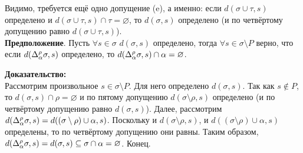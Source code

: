 \hrulefill

Видимо, требуется ещё одно допущение (e), а именно: если $d(\sigma \cup \tau, s)$ определено и $d(\sigma \cup \tau, s) \cap \tau = \varnothing$, то $d(\sigma, s)$ определено (и по четвёртому допущению равно $d(\sigma \cup \tau, s)$).\\

\textbf{Предположение}. Пусть $\forall s \in \sigma$ $d(\sigma, s)$ определено, тогда $\forall s \in \sigma \setminus P$ верно, что если $d(\Delta_\alpha^\rho\sigma, s)$ определено, то $d(\Delta_\alpha^\rho\sigma, s) \cap \alpha = \varnothing$.

\textbf{Доказательство:}\\
Рассмотрим произвольное $s \in \sigma \setminus P$. Для него определено $d(\sigma, s)$. Так как $s \notin P$, то $d(\sigma, s) \cap \rho = \varnothing$ и по пятому допущению $d(\sigma \setminus \rho, s)$ определено (и по четвёртому допущению равно $d(\sigma, s)$). Далее, рассмотрим $d(\Delta_\alpha^\rho\sigma, s) = d((\sigma\setminus\rho)\cup\alpha, s)$. Поскольку и $d(\sigma \setminus \rho, s)$, и $d((\sigma\setminus\rho)\cup\alpha, s)$ определены, то по четвёртому допущению они равны. Таким образом, $d(\Delta_\alpha^\rho\sigma, s) = d(\sigma, s) \subseteq \sigma \cap \alpha = \varnothing$. Конец.

